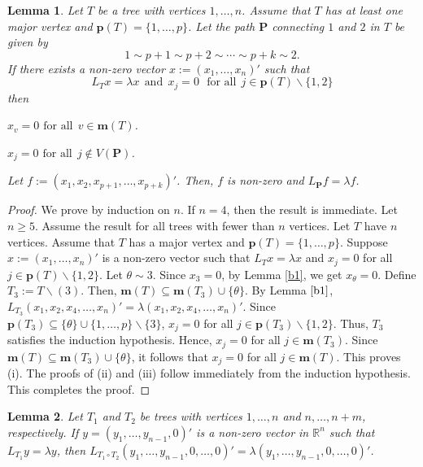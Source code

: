 \documentclass[preprint,12pt]{elsarticle}
\newcommand{\rr}{\mathbb{R}}
\newcommand{\1}{\mathbf{1}}
\newcommand{\0}{\mathbf{0}}
\newcommand{\p}{{\mathbf{P}}}
\def\m{\mathbf{m}}
\def\pt{\mathbf{p}}
\def\p{\mathbf{P}}
\newtheorem{lemma}{Lemma}
\begin{document}
\begin{lemma} \label{newlem5}
Let $T$ be a tree with vertices $1,\dotsc,n$.
Assume that $T$ has at least one major vertex
and $\pt(T)=\{1,\dotsc,p\}$. Let the path $\p$ connecting $1$ and $2$ in $T$ be
given by \[1 \sim p+1 \sim p+2 \sim \cdots \sim p+k \sim 2.\]
If there exists a non-zero vector $x:=(x_1,\dotsc,x_n)'$ such that
\[L_Tx=\lambda x~~\mbox{and}~~x_{j}=0~~~\mbox{for all}~~ j \in \pt(T) \smallsetminus \{1,2\}\] 
then
\item[\rm (i)] $x_v=0$ $ \mbox{for all}~~ v \in \m(T)$.
\item[\rm (ii)] $x_j=0$ $ \mbox{for all}~~ j \notin V(\p)$.
\item[\rm (iii)] Let $f:=(x_1,x_2,x_{p+1},\dotsc,x_{p+k})'$. Then, $f$ is non-zero and
$L_{\p}f=\lambda f$.
\end{lemma}
\begin{proof}
We prove by induction on $n$. 
If $n=4$, then the result is immediate.
Let $n\geq 5$. Assume the result for all trees with fewer than $n$ vertices. 
Let $T$ have $n$ vertices.  Assume that $T$ has a major vertex and
$\pt(T)=\{1,\dotsc,p\}$.
Suppose $x:=(x_1,\dotsc,x_n)'$ is a non-zero vector such that
$L_Tx=\lambda x$ and $x_j=0$ for all $j \in \pt(T) \smallsetminus \{1,2\}$.
Let $\theta \sim 3$. 
Since $x_3=0$,
by Lemma \ref{b1}, we get
$x_{\theta}=0$.
Define
$T_3:=T \smallsetminus (3)$.
Then, $\m(T) \subseteq \m(T_3) \cup \{\theta\}$.
By Lemma $\ref{b1}$,
$L_{T_3}(x_1,x_2,x_4,\dotsc,x_n)'=\lambda (x_1,x_2,x_4,\dotsc,x_n)'$.
Since $\pt(T_3) \subseteq \{\theta\}\cup\{1,\dotsc,p\} \smallsetminus \{3\}$,
$x_{j}=0$ for all $j \in \pt(T_3) \smallsetminus \{1,2\}$. 
Thus, $T_3$ satisfies the induction hypothesis. 
Hence, 
$x_j=0$ for all $j \in \m(T_3)$.
Since
$\m(T) \subseteq \m(T_3) \cup \{\theta\}$, it follows that
$x_j=0$ for all $j \in \m(T)$.
This proves (i).
The proofs of (ii) and (iii) follow immediately from the induction hypothesis.
This completes the proof.
\end{proof}









\begin{lemma}\label{v1}
    Let $T_1$ and $T_2$ be trees with vertices $1,\dotsc,n$ and 
    $n,\dotsc,n+m$, respectively. If
  $y=(y_1,\dotsc,y_{n-1},0)'$ is a non-zero vector in $\rr^{n}$ such that
  $L_{T_1}y=\lambda y$, then $L_{T_{1} \circ T_2}(y_1,\dotsc,y_{n-1},0,\dotsc,0)'=\lambda (y_1,\dotsc,y_{n-1},0,\dotsc,0)'$.
\end{lemma}
\end{document}
